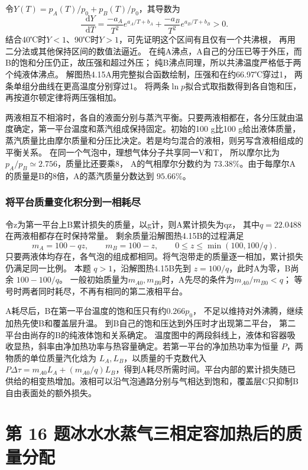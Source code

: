 \documentclass[UTF8,fontset=fandol,a4paper,11pt]{ctexart}
\newcommand{\dd}{\mathop{}\!\mathrm{d}}
\begin{document}
令$Y(T)=p_A(T)/p_0+p_B(T)/p_0$，其导数为
\[
\frac{\dd Y}{\dd T}
=\frac{-a_A}{T^2}e^{a_A/T+b_A}
+\frac{-a_B}{T^2}e^{a_B/T+b_B}>0.
\]
结合40℃时$Y<1$、90℃时$Y>1$，可先证明这个区间有且仅有一个共沸根，
再用二分法或其他保持区间的数值法逼近。
在纯A沸点，A自己的分压已等于外压，而B的饱和分压仍正，故压强和超过外压；
纯B沸点同理，所以共沸温度严格低于两个纯液体沸点。
解图热4.15A用完整拟合函数绘制，压强和在约66.97℃穿过1，
两条单组分曲线在更高温度分别穿过1。
将两条$\ln p$拟合式取指数得到各自饱和压，再按道尔顿定律将两压强相加。

两液相互不相溶时，各自的液面分别与蒸汽平衡。只要两液相都在，各分压就由温度确定，第一平台温度和蒸汽组成保持固定。初始的100 g比100 g给出液体质量，蒸汽质量比由摩尔质量和分压比决定。若是均匀混合的液相，则另写含液相组成的平衡关系。
在同一个气泡中，理想气体分子共享同一V和T，
所以摩尔比为$p_A/p_B\simeq2.756$，质量比还要乘8，
A的气相摩尔分数约为 $73.38\%$。由于每摩尔A的质量是B的8倍，A的蒸汽质量分数达到 $95.66\%$。

\subsubsection*{将平台质量变化积分到一相耗尽}
令z为第一平台上B累计损失的质量，以g计，则A累计损失为qz，
其中$q=22.0488$在两液相都存在时保持常量。
剩余质量沿解图热4.15B的过程满足
\[
m_A=100-qz,\qquad m_B=100-z,\qquad
0\le z\le\min(100,100/q).
\]
只要两液体均存在，各气泡的组成都相同。将气泡带走的质量逐一相加，累计损失仍满足同一比例。
本题 $q>1$，沿解图热4.15B先到 $z=100/q$，此时A为零，B尚余 $100-100/q$。
一般初始质量为$m_{A0},m_{B0}$时，A先尽的条件为$m_{A0}/m_{B0}<q$；
等号时两者同时耗尽，不再有相同的第二液相平台。

A耗尽后，B在第一平台温度的饱和压只有约$0.266p_0$，
不足以维持对外沸腾，继续加热先使B和覆盖层升温。
到B自己的饱和压达到外压时才出现第二平台，
第二平台由尚存的B的纯液体饱和关系确定。
温度图中的两段斜线上，液体和容器吸收显热，斜率由净加热功率与热容量确定。若第一平台的净加热功率为恒量 $P$，两物质的单位质量汽化焓为 $L_A,L_B$，以质量的千克数代入 $P\Delta\tau=m_{A0}L_A+(m_{A0}/q)L_B$，得到A耗尽所需时间。平台内部的累计损失随已供给的相变热增加。液相可以沿气泡通路分别与气相达到饱和，覆盖层C只抑制B自由表面处的额外损失。




\section*{第 16 题\quad 冰水水蒸气三相定容加热后的质量分配}
\end{document}
